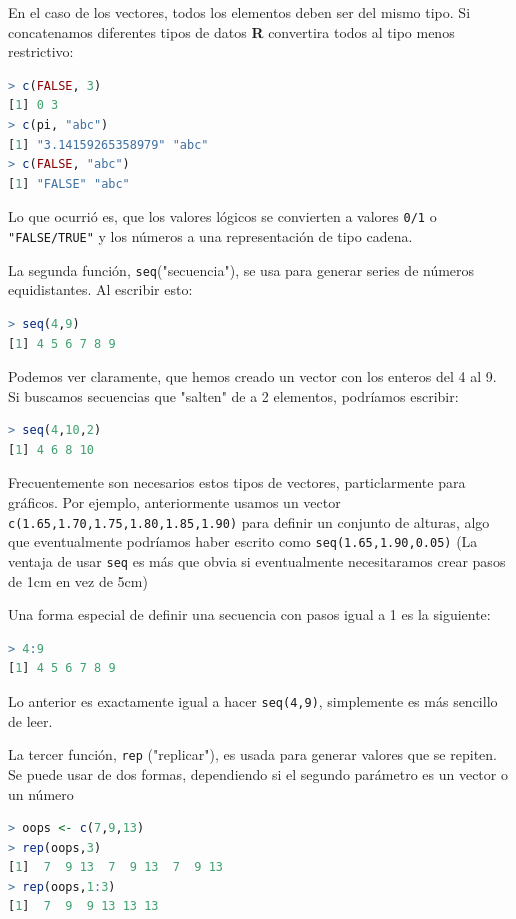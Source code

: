 \documentclass[spanish]{extbook}
\numberwithin{equation}{section}
\numberwithin{figure}{section}
\begin{document}
En el caso de los vectores, todos los elementos deben ser del mismo tipo. Si
concatenamos diferentes tipos de datos \textbf{R} convertira todos al tipo menos
restrictivo:

\begin{lstlisting}[language=R]
> c(FALSE, 3)
[1] 0 3
> c(pi, "abc")
[1] "3.14159265358979" "abc"
> c(FALSE, "abc")
[1] "FALSE" "abc"
\end{lstlisting}

Lo que ocurrió es, que los valores lógicos se convierten a valores \texttt{0/1}
o \texttt{"FALSE/TRUE"} y los números a una representación de tipo cadena.

La segunda función, \texttt{seq}("secuencia"), se usa para generar series de
números equidistantes. Al escribir esto:

\begin{lstlisting}[language=R]
> seq(4,9)
[1] 4 5 6 7 8 9
\end{lstlisting}

Podemos ver claramente, que hemos creado un vector con los enteros del 4 al 9.
Si buscamos secuencias que "salten" de a 2 elementos, podríamos escribir:

\begin{lstlisting}[language=R]
> seq(4,10,2)
[1] 4 6 8 10
\end{lstlisting}

Frecuentemente son necesarios estos tipos de vectores, particlarmente para
gráficos. Por ejemplo, anteriormente usamos un vector
\texttt{c(1.65,1.70,1.75,1.80,1.85,1.90)} para definir un conjunto de alturas,
algo que eventualmente podríamos haber escrito como
\texttt{seq(1.65,1.90,0.05)} (La ventaja de usar \texttt{seq} es más que obvia
si eventualmente necesitaramos crear pasos de 1cm en vez de 5cm)

Una forma especial de definir una secuencia con pasos igual a 1 es la siguiente:

\begin{lstlisting}[language=R]
> 4:9
[1] 4 5 6 7 8 9
\end{lstlisting}

Lo anterior es exactamente igual a hacer \texttt{seq(4,9)}, simplemente es más
sencillo de leer.

La tercer función, \texttt{rep} ("replicar"), es usada para generar valores que
se repiten. Se puede usar de dos formas, dependiendo si el segundo parámetro es
un vector o un número

\begin{lstlisting}[language=R]
> oops <- c(7,9,13)
> rep(oops,3)
[1]  7  9 13  7  9 13  7  9 13
> rep(oops,1:3)
[1]  7  9  9 13 13 13
\end{lstlisting}
\end{document}
